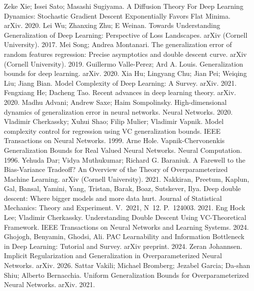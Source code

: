  Zeke Xie; Issei Sato; Masashi Sugiyama. A Diffusion Theory For Deep Learning Dynamics: Stochastic Gradient Descent Exponentially Favors Flat Minima. arXiv. 2020.
 Lei Wu; Zhanxing Zhu; E Weinan. Towards Understanding Generalization of Deep Learning: Perspective of Loss Landscapes. arXiv (Cornell University). 2017.
 Mei Song; Andrea Montanari. The generalization error of random features regression: Precise asymptotics and double descent curve. arXiv (Cornell University). 2019.
 Guillermo Valle-Perez; Ard A. Louis. Generalization bounds for deep learning. arXiv. 2020.
 Xia Hu; Lingyang Chu; Jian Pei; Weiqing Liu; Jiang Bian. Model Complexity of Deep Learning: A Survey. arXiv. 2021.
 Fengxiang He; Dacheng Tao. Recent advances in deep learning theory. arXiv. 2020.
 Madhu Advani; Andrew Saxe; Haim Sompolinsky. High-dimensional dynamics of generalization error in neural networks. Neural Networks. 2020.
 Vladimir Cherkassky; Xuhui Shao; Filip Mulier; Vladimir Vapnik. Model complexity control for regression using VC generalization bounds. IEEE Transactions on Neural Networks. 1999.
 Arne Hole. Vapnik-Chervonenkis Generalization Bounds for Real Valued Neural Networks. Neural Computation. 1996.
 Yehuda Dar; Vidya Muthukumar; Richard G. Baraniuk. A Farewell to the Bias-Variance Tradeoff? An Overview of the Theory of Overparameterized Machine Learning. arXiv (Cornell University). 2021.
 Nakkiran, Preetum, Kaplun, Gal, Bansal, Yamini, Yang, Tristan, Barak, Boaz, Sutskever, Ilya. Deep double descent: Where bigger models and more data hurt. Journal of Statistical Mechanics: Theory and Experiment. V.~2021, N~12. P.~124003. 2021.
 Eng Hock Lee; Vladimir Cherkassky. Understanding Double Descent Using VC-Theoretical Framework. IEEE Transactions on Neural Networks and Learning Systems. 2024.
 Ghojogh, Benyamin, Ghodsi, Ali. PAC Learnability and Information Bottleneck in Deep Learning: Tutorial and Survey. arXiv preprint. 2024.
 Zeran Johannsen. Implicit Regularization and Generalization in Overparameterized Neural Networks. arXiv. 2026.
 Sattar Vakili; Michael Bromberg; Jezabel Garcia; Da-shan Shiu; Alberto Bernacchia. Uniform Generalization Bounds for Overparameterized Neural Networks. arXiv. 2021.
